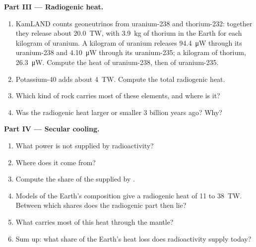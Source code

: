 \begin{problem}
\medskip
\noindent\textbf{Part III --- Radiogenic heat.}
\begin{enumerate}[resume]
  \item KamLAND counts geoneutrinos from uranium-238 and thorium-232: together
        they release about \qty{20.0}{TW}, with \qty{3.9}{kg} of thorium in
        the Earth for each kilogram of uranium. A kilogram of uranium releases
        \qty{94.4}{\micro W} through its uranium-238 and \qty{4.10}{\micro W}
        through its uranium-235; a kilogram of thorium, \qty{26.3}{\micro W}.
        Compute the heat of uranium-238, then of uranium-235.
  \item Potassium-40 adds about \qty{4}{TW}. Compute the total radiogenic heat.
  \item Which kind of rock carries most of these elements, and where is it?
  \item Was the radiogenic heat larger or smaller 3 billion years ago? Why?
\end{enumerate}

\medskip
\noindent\textbf{Part IV --- Secular cooling.}
\begin{enumerate}[resume]
  \item What power is not supplied by radioactivity?
  \item Where does it come from?
  \item Compute the share of the  supplied by .
  \item Models of the Earth's composition give a radiogenic heat of 11 to
        \qty{38}{TW}.
        Between which shares does the radiogenic part then lie?
  \item What carries most of this heat through the mantle?
  \item Sum up: what share of the Earth's heat loss does radioactivity supply
        today?
\end{enumerate}
\end{problem}
